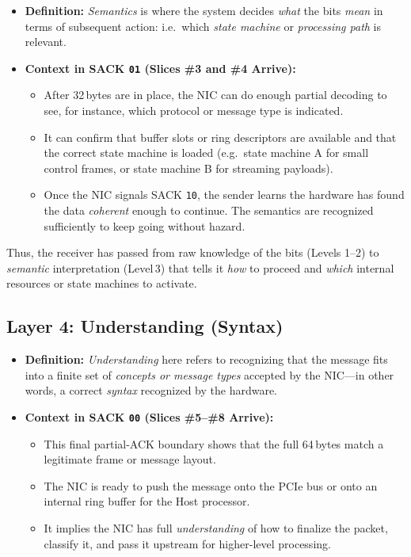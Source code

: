 \documentclass[../HFT-main.tex]{subfiles}
\begin{document}
\begin{itemize}
  \item \textbf{Definition:} \emph{Semantics} is where the system decides \emph{what} the bits \emph{mean} in terms of subsequent action: i.e.\ which \emph{state machine} or \emph{processing path} is relevant.
  \item \textbf{Context in SACK \texttt{01} (Slices \#3 and \#4 Arrive):}
  \begin{itemize}
    \item After 32\,bytes are in place, the NIC can do enough partial decoding to see, for instance, which protocol or message type is indicated. 
    \item It can confirm that buffer slots or ring descriptors are available and that the correct state machine is loaded (e.g.\ state machine A for small control frames, or state machine B for streaming payloads).
    \item Once the NIC signals SACK \texttt{10}, the sender learns the hardware has found the data \emph{coherent} enough to continue. The semantics are recognized sufficiently to keep going without hazard.
  \end{itemize}
\end{itemize}

\vspace{6pt}

\noindent
Thus, the receiver has passed from raw knowledge of the bits (Levels 1--2) to \emph{semantic} interpretation (Level\,3) that tells it \emph{how} to proceed and \emph{which} internal resources or state machines to activate.

\subsection*{Layer 4: Understanding (Syntax)}

\begin{itemize}
  \item \textbf{Definition:} \emph{Understanding} here refers to recognizing that the message fits into a finite set of \emph{concepts or message types} accepted by the NIC---in other words, a correct \emph{syntax} recognized by the hardware. 
  \item \textbf{Context in SACK \texttt{00} (Slices \#5--\#8 Arrive):}
  \begin{itemize}
    \item This final partial-ACK boundary shows that the full 64\,bytes match a legitimate frame or message layout. 
    \item The NIC is ready to push the message onto the PCIe bus or onto an internal ring buffer for the Host processor. 
    \item It implies the NIC has full \emph{understanding} of how to finalize the packet, classify it, and pass it upstream for higher-level processing.
  \end{itemize}
\end{itemize}
\end{document}
